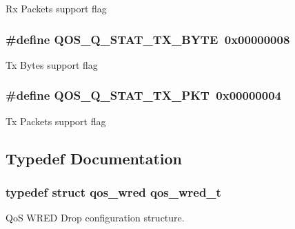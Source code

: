 Rx Packets support flag \hypertarget{group__FAPI__QOS__QUEUE_gaae63033c6c8e70e7f6f44ffbcdfe2d98}{
\subsubsection[{Q\-O\-S\-\_\-\-Q\-\_\-\-S\-T\-A\-T\-\_\-\-T\-X\-\_\-\-B\-Y\-T\-E}]{\setlength{\rightskip}{0pt plus 5cm}\#define Q\-O\-S\-\_\-\-Q\-\_\-\-S\-T\-A\-T\-\_\-\-T\-X\-\_\-\-B\-Y\-T\-E~0x00000008}}\label{group__FAPI__QOS__QUEUE_gaae63033c6c8e70e7f6f44ffbcdfe2d98}
Tx Bytes support flag \hypertarget{group__FAPI__QOS__QUEUE_gadb32e8befc0db998929b240570021e27}{
\subsubsection[{Q\-O\-S\-\_\-\-Q\-\_\-\-S\-T\-A\-T\-\_\-\-T\-X\-\_\-\-P\-K\-T}]{\setlength{\rightskip}{0pt plus 5cm}\#define Q\-O\-S\-\_\-\-Q\-\_\-\-S\-T\-A\-T\-\_\-\-T\-X\-\_\-\-P\-K\-T~0x00000004}}\label{group__FAPI__QOS__QUEUE_gadb32e8befc0db998929b240570021e27}
Tx Packets support flag 

\subsection{Typedef Documentation}
\hypertarget{group__FAPI__QOS__QUEUE_ga42b4d8fefa10f2b563d6151e772c6b3c}{
\subsubsection[{qos\-\_\-wred\-\_\-t}]{\setlength{\rightskip}{0pt plus 5cm}typedef struct {\bf qos\-\_\-wred} {\bf qos\-\_\-wred\-\_\-t}}}\label{group__FAPI__QOS__QUEUE_ga42b4d8fefa10f2b563d6151e772c6b3c}


Qo\-S W\-R\-E\-D Drop configuration structure. 

